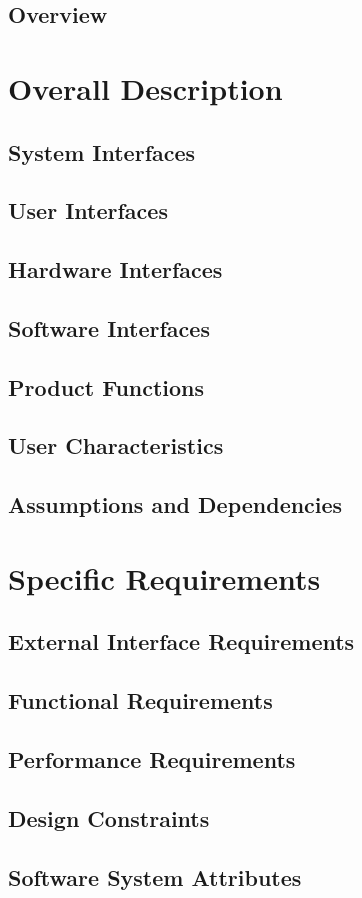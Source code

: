 \documentclass[12pt,a4paper]{article}
\begin{document}
   	\subsection{Overview}

   \section{Overall Description}
   	\subsection{System Interfaces}
   	
   	\subsection{User Interfaces}
   		
   	\subsection{Hardware Interfaces}
   	
   	\subsection{Software Interfaces}
   	
   	\subsection{Product Functions}
   	
	\subsection{User Characteristics}   	
   		
   	\subsection{Assumptions and Dependencies}

   \section{Specific Requirements}
	\subsection{External Interface Requirements}
	
	\subsection{Functional Requirements}
	
	\subsection{Performance Requirements}
	
	\subsection{Design Constraints}
	
	\subsection{Software System Attributes}
   
\end{document}
